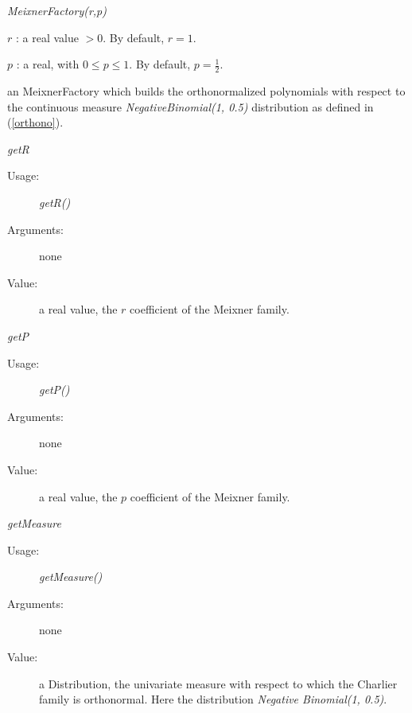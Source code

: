 \begin{description}
\item[Usage:] \textit{MeixnerFactory(r,p)}


\item[Arguments:]   \rule{0pt}{1em}
\begin{description}
\item $r$ : a real value $>0$. By default, $r=1$.
\item $p$ : a real, with $0 \leq p \leq 1$. By default, $p=\displaystyle \frac{1}{2}$.
\end{description}


\item[Value:]  an MeixnerFactory which builds the orthonormalized polynomials with respect to the continuous measure \textit{NegativeBinomial(1, 0.5)} distribution as defined in (\ref{orthono}).

\item[Some methods :]  \rule{0pt}{1em}

\begin{description}

\item \textit{getR}
\begin{description}
\item[Usage:] \textit{getR()}
\item[Arguments:] none
\item[Value:]  a real value, the $r$ coefficient of the Meixner family.
\end{description}
\bigskip

\item \textit{getP}
\begin{description}
\item[Usage:] \textit{getP()}
\item[Arguments:] none
\item[Value:]  a real value, the $p$ coefficient of the Meixner family.
\end{description}
\bigskip

\item \textit{getMeasure}
\begin{description}
\item[Usage:] \textit{getMeasure()}
\item[Arguments:] none
\item[Value:]  a Distribution, the univariate measure with respect to which the Charlier family is orthonormal. Here the  distribution \textit{Negative Binomial(1, 0.5)}.
\end{description}
\end{description}
\end{description}




